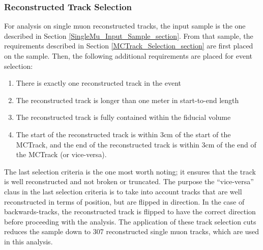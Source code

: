 \subsubsection{Reconstructed Track Selection}\label{RecoTrack_Selection_section}
For analysis on single muon reconstructed tracks, the input sample is the one described in Section \ref{SingleMu_Input_Sample_section}. From that sample, the requirements described in Section \ref{MCTrack_Selection_section} are first placed on the sample. Then, the following additional requirements are placed for event selection:
\begin{enumerate}
	\item There is exactly one reconstructed track in the event
	\item The reconstructed track is longer than one meter in start-to-end length
	\item The reconstructed track is fully contained within the fiducial volume
	\item The start of the reconstructed track is within 3cm of the start of the {\sc MCTrack}, and the end of the reconstructed track is within 3cm of the end of the {\sc MCTrack} (or vice-versa).
\end{enumerate}
The last selection criteria is the one most worth noting; it ensures that the track is well reconstructed and not broken or truncated. The purpose the ``vice-versa'' claus in the last selection criteria is to take into account tracks that are well reconstructed in terms of position, but are flipped in direction. In the case of backwards-tracks, the reconstructed track is flipped to have the correct direction before proceeding with the analysis. The application of these track selection cuts reduces the sample down to 307 reconstructed single muon tracks, which are used in this analysis.



